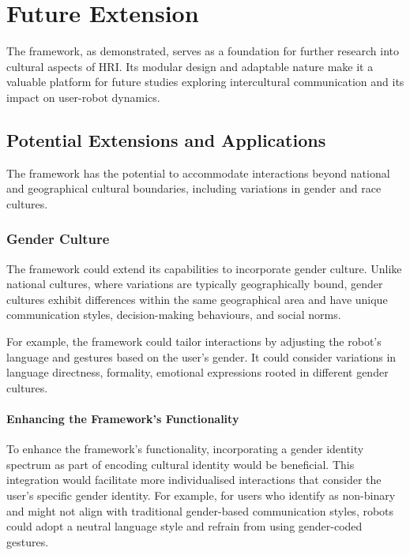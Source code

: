 
\chapter{Future Extension}

The framework, as demonstrated, serves as a foundation for further research into cultural aspects of HRI. Its modular design and adaptable nature make it a valuable platform for future studies exploring intercultural communication and its impact on user-robot dynamics.

\section{Potential Extensions and Applications}

The framework has the potential to accommodate interactions beyond national and geographical cultural boundaries, including variations in gender and race cultures.

\subsection{Gender Culture}

The framework could extend its capabilities to incorporate gender culture. Unlike national cultures, where variations are typically geographically bound, gender cultures exhibit differences within the same geographical area and have unique communication styles, decision-making behaviours, and social norms.

For example, the framework could tailor interactions by adjusting the robot's language and gestures based on the user's gender. It could consider variations in language directness, formality, emotional expressions rooted in different gender cultures.

\subsubsection{Enhancing the Framework's Functionality}

To enhance the framework's functionality, incorporating a gender identity spectrum as part of encoding cultural identity would be beneficial. This integration would facilitate more individualised interactions that consider the user's specific gender identity. For example, for users who identify as non-binary and might not align with traditional gender-based communication styles, robots could adopt a neutral language style and refrain from using gender-coded gestures.

